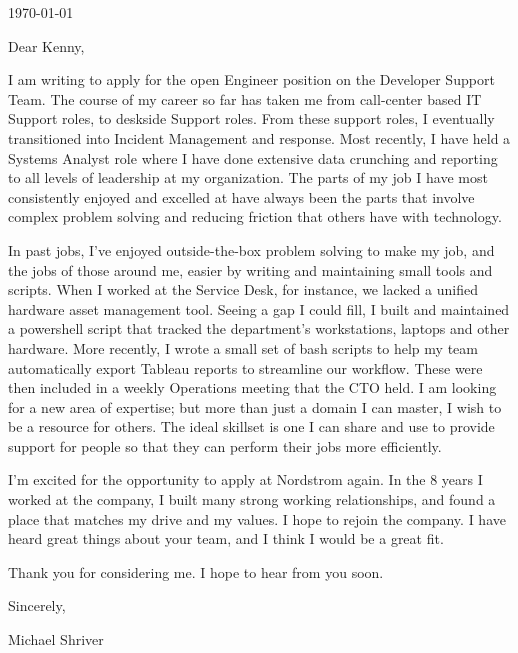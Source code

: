 \documentclass[10pt,oneside]{article}
\begin{document}
\hfill\dte\today
\heading
\vspace{\baselineskip}
\vspace{\baselineskip}

Dear Kenny,

\vspace{\baselineskip}

I am writing to apply for the open Engineer position on the Developer Support Team. The course of my career so far has taken me from call-center based IT Support roles, to deskside Support roles. From these support roles, I eventually transitioned into Incident Management and response. Most recently, I have held a Systems Analyst role where I have done extensive data crunching and reporting to all levels of leadership at my organization. The parts of my job I have most consistently enjoyed and excelled at have always been the parts that involve complex problem solving and reducing friction that others have with technology.

\vspace{\baselineskip}

In past jobs, I’ve enjoyed outside-the-box problem solving to make my job, and the jobs of those around me, easier by writing and maintaining small tools and scripts. When I worked at the Service Desk, for instance, we lacked a unified hardware asset management tool. Seeing a gap I could fill, I built and maintained a powershell script that tracked the department’s workstations, laptops and other hardware. More recently, I wrote a small set of bash scripts to help my team automatically export Tableau reports to streamline our workflow. These were then included in a weekly Operations meeting that the CTO held. I am looking for a new area of expertise; but more than just a domain I can master, I wish to be a resource for others. The ideal skillset is one I can share and use to provide support for people so that they can perform their jobs more efficiently.

\vspace{\baselineskip}

I’m excited for the opportunity to apply at Nordstrom again. In the 8 years I worked at the company, I built many strong working relationships, and found a place that matches my drive and my values. I hope to rejoin the company. I have heard great things about your team, and I think I would be a great fit.

\vspace{\baselineskip}

Thank you for considering me. I hope to hear from you soon.

\vspace{\baselineskip}

Sincerely,

\vspace{\baselineskip}

Michael Shriver
\end{document}
